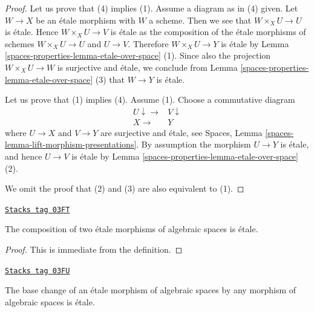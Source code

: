 \begin{proof}
Let us prove that (4) implies (1). Assume a diagram as in (4) given.
Let $W \to X$ be an \'etale morphism with $W$ a scheme. Then we see
that $W \times_X U \to U$ is \'etale. Hence $W \times_X U \to V$ is \'etale
as the composition of the \'etale morphisms of schemes $W \times_X U \to U$
and $U \to V$. Therefore $W \times_X U \to Y$ is \'etale by
Lemma \ref{spaces-properties-lemma-etale-over-space} (1). Since also
the projection $W \times_X U \to W$ is surjective and \'etale, we conclude
from Lemma \ref{spaces-properties-lemma-etale-over-space} (3) that $W \to Y$ is \'etale.

\medskip\noindent
Let us prove that (1) implies (4). Assume (1). Choose a commutative diagram
$$
\begin{array}{cc}U \downarrow\longrightarrow & V \downarrow \\ X \longrightarrow & Y\end{array}
$$
where $U \to X$ and $V \to Y$ are surjective and \'etale, see
Spaces, Lemma \ref{spaces-lemma-lift-morphism-presentations}.
By assumption the morphism $U \to Y$ is \'etale,
and hence $U \to V$ is \'etale by Lemma \ref{spaces-properties-lemma-etale-over-space} (2).

\medskip\noindent
We omit the proof that (2) and (3) are also equivalent to (1).
\end{proof}

\begin{lemma}
\label{spaces-properties-lemma-composition-etale}
\href{https://stacks.math.columbia.edu/tag/03FT}{\texttt{Stacks tag 03FT}}

The composition of two \'etale morphisms of algebraic spaces
is \'etale.
\end{lemma}

\begin{proof}
This is immediate from the definition.
\end{proof}

\begin{lemma}
\label{spaces-properties-lemma-base-change-etale}
\href{https://stacks.math.columbia.edu/tag/03FU}{\texttt{Stacks tag 03FU}}

The base change of an \'etale morphism of algebraic spaces
by any morphism of algebraic spaces is \'etale.
\end{lemma}

